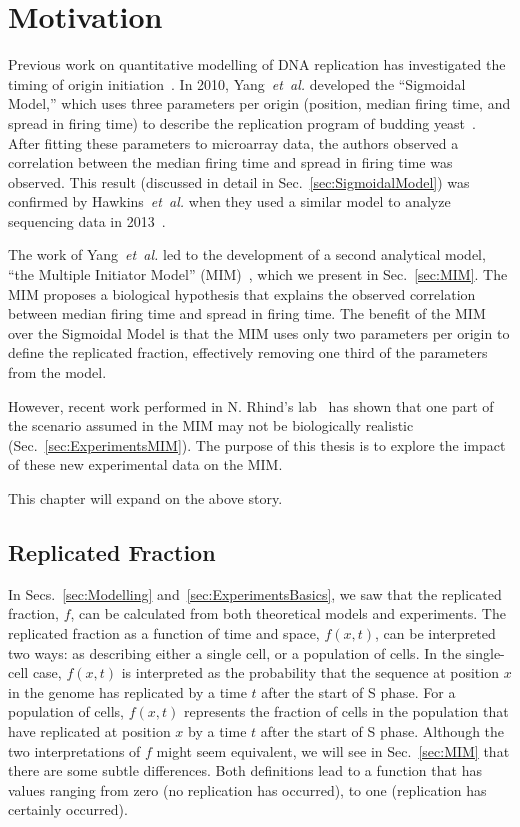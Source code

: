 \chapter{Motivation}
\label{ch:Motivation}

Previous work on quantitative modelling of DNA replication has investigated the timing of origin initiation~\cite{ScottsPaper,deMouraModel1,StochasticTermination,Goldar2009,OriginTimingReview}.
In 2010, Yang~\emph{et~al.} developed the ``Sigmoidal Model,'' which uses three parameters per origin (position, median firing time, and spread in firing time) to describe the replication program of budding yeast~\cite{ScottsPaper}.
After fitting these parameters to microarray data, the authors observed a correlation between the median firing time and spread in firing time was observed.
This result (discussed in detail in Sec.~\ref{sec:SigmoidalModel}) was confirmed by Hawkins~\emph{et~al.} when they used a similar model to analyze sequencing data in 2013~\cite{StochasticTermination}.

The work of Yang~\emph{et~al.} led to the development of a second analytical model, ``the Multiple Initiator Model'' (MIM)~\cite{ScottsPaper}, which we present in Sec.~\ref{sec:MIM}.
The MIM proposes a biological hypothesis that explains the observed correlation between median firing time and spread in firing time.
The benefit of the MIM over the Sigmoidal Model is that the MIM uses only two parameters per origin to define the replicated fraction, effectively removing one third of the parameters from the model.

However, recent work performed in N. Rhind's lab~\cite{Rhind} has shown that one part of the scenario assumed in the MIM may not be biologically realistic (Sec.~\ref{sec:ExperimentsMIM}).
The purpose of this thesis is to explore the impact of these new experimental data on the MIM.

This chapter will expand on the above story.


	\section{Replicated Fraction}
	\label{sec:ReplicatedFraction}
	
	In Secs.~\ref{sec:Modelling} and~\ref{sec:ExperimentsBasics}, we saw that the replicated fraction, $f$, can be calculated from both theoretical models and experiments.
	The replicated fraction as a function of time and space, $f(x,t)$, can be interpreted two ways:
	as describing either a single cell, or a population of cells.
	In the single-cell case, $f(x,t)$ is interpreted as the probability that the sequence at position $x$ in the genome has replicated by a time $t$ after the start of S phase.
	For a population of cells, $f(x,t)$ represents the fraction of cells in the population that have replicated at position $x$ by a time $t$ after the start of S phase.
	Although the two interpretations of $f$ might seem equivalent, we will see in Sec.~\ref{sec:MIM} that there are some subtle differences.
	Both definitions lead to a function that has values ranging from zero (no replication has occurred), to one (replication has certainly occurred).
	
